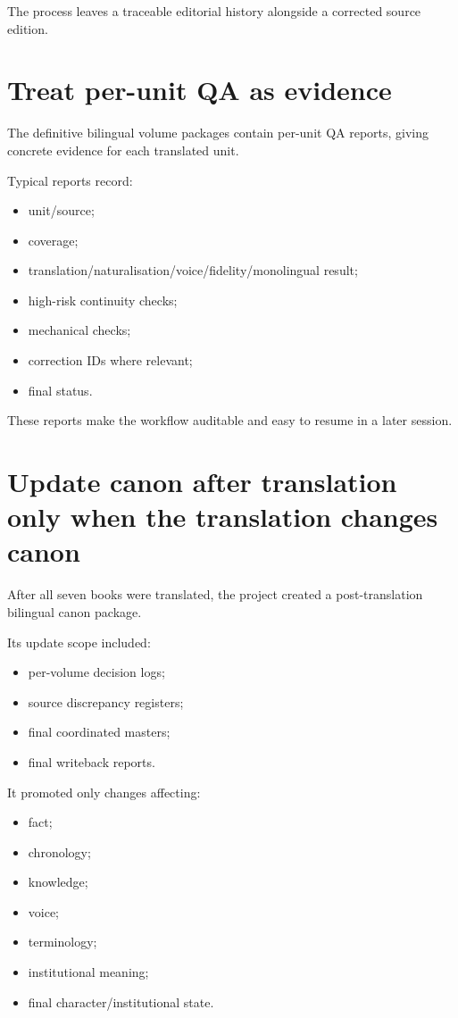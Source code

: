 \documentclass[11pt,oneside,openany]{book}
\providecommand{\tightlist}{%
  \setlength{\itemsep}{0pt}\setlength{\parskip}{0pt}}
\begin{document}
The process leaves a traceable editorial history alongside a corrected source edition.

\chapter{Treat per-unit QA as evidence}

The definitive bilingual volume packages contain per-unit QA reports, giving concrete evidence for each translated unit.

Typical reports record:

\begin{itemize}
\tightlist
\item
  unit/source;
\item
  coverage;
\item
  translation/naturalisation/voice/fidelity/monolingual result;
\item
  high-risk continuity checks;
\item
  mechanical checks;
\item
  correction IDs where relevant;
\item
  final status.
\end{itemize}

These reports make the workflow auditable and easy to resume in a later session.

\chapter{Update canon after translation only when the translation changes canon}

After all seven books were translated, the project created a post-translation bilingual canon package.

Its update scope included:

\begin{itemize}
\tightlist
\item
  per-volume decision logs;
\item
  source discrepancy registers;
\item
  final coordinated masters;
\item
  final writeback reports.
\end{itemize}

It promoted only changes affecting:

\begin{itemize}
\tightlist
\item
  fact;
\item
  chronology;
\item
  knowledge;
\item
  voice;
\item
  terminology;
\item
  institutional meaning;
\item
  final character/institutional state.
\end{itemize}
\end{document}
